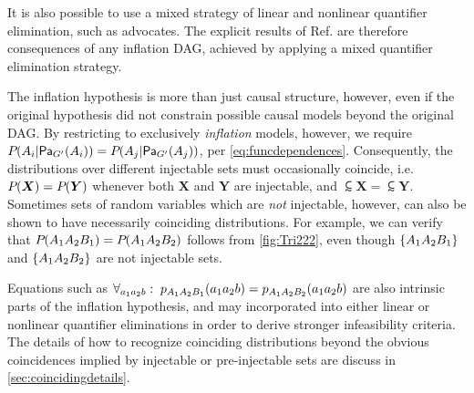 It is also possible to use a mixed strategy of linear and nonlinear quantifier elimination, such as \citet{ChavesPolynomial} advocates. The explicit results of Ref. \cite{ChavesPolynomial} are therefore consequences of any inflation DAG, achieved by applying a mixed quantifier elimination strategy.


The inflation hypothesis is more than just causal structure, however, even if the original hypothesis did not constrain possible causal models beyond the original DAG.  By restricting to exclusively \emph{inflation} models, however, we require $\pdf{A_i| \Pa[G']{A_i}}=\pdf{A_j|\Pa[G']{A_j}}$, per \cref{eq:funcdependences}. Consequently, the distributions over different injectable sets must occasionally coincide, i.e. $\pdf{\bm{X}}=\pdf{\bm{Y}}$ whenever both $\bm{X}$ and $\bm{Y}$ are injectable, and $\subsim{\bm{X}}=\subsim{\bm{Y}}$. Sometimes sets of random variables which are \emph{not} injectable, however, can also be shown to have necessarily coinciding distributions. For example, we can verify that $\pdf{A_1 A_2 B_1}=\pdf{A_1 A_2 B_2}$ follows from \cref{fig:Tri222}, even though $\brackets{A_1 A_2 B_1}$ and $\brackets{A_1 A_2 B_2}$ are not injectable sets.

Equations such as $\forall_{a_1 a_2 b}:\;\p[A_1 A_2 B_1]{a_1 a_2 b} = \p[A_1 A_2 B_2]{a_1 a_2 b}$ are also intrinsic parts of the inflation hypothesis, and may incorporated into either linear or nonlinear quantifier eliminations in order to derive stronger infeasibility criteria. The details of how to recognize coinciding distributions beyond the obvious coincidences implied by injectable or pre-injectable sets are discuss in \cref{sec:coincidingdetails}.





